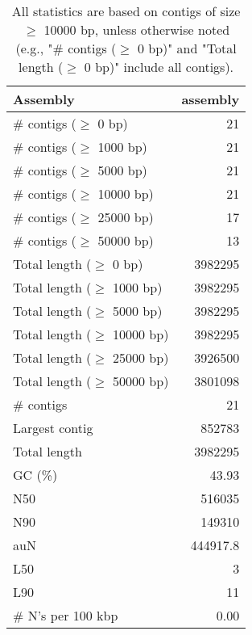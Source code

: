 \documentclass[12pt,a4paper]{article}
\begin{document}
\begin{table}[ht]
\begin{center}
\caption{All statistics are based on contigs of size $\geq$ 10000 bp, unless otherwise noted (e.g., "\# contigs ($\geq$ 0 bp)" and "Total length ($\geq$ 0 bp)" include all contigs).}
\begin{tabular}{|l*{1}{|r}|}
\hline
Assembly & assembly \\ \hline
\# contigs ($\geq$ 0 bp) & 21 \\ \hline
\# contigs ($\geq$ 1000 bp) & 21 \\ \hline
\# contigs ($\geq$ 5000 bp) & 21 \\ \hline
\# contigs ($\geq$ 10000 bp) & 21 \\ \hline
\# contigs ($\geq$ 25000 bp) & 17 \\ \hline
\# contigs ($\geq$ 50000 bp) & 13 \\ \hline
Total length ($\geq$ 0 bp) & 3982295 \\ \hline
Total length ($\geq$ 1000 bp) & 3982295 \\ \hline
Total length ($\geq$ 5000 bp) & 3982295 \\ \hline
Total length ($\geq$ 10000 bp) & 3982295 \\ \hline
Total length ($\geq$ 25000 bp) & 3926500 \\ \hline
Total length ($\geq$ 50000 bp) & 3801098 \\ \hline
\# contigs & 21 \\ \hline
Largest contig & 852783 \\ \hline
Total length & 3982295 \\ \hline
GC (\%) & 43.93 \\ \hline
N50 & 516035 \\ \hline
N90 & 149310 \\ \hline
auN & 444917.8 \\ \hline
L50 & 3 \\ \hline
L90 & 11 \\ \hline
\# N's per 100 kbp & 0.00 \\ \hline
\end{tabular}
\end{center}
\end{table}
\end{document}
